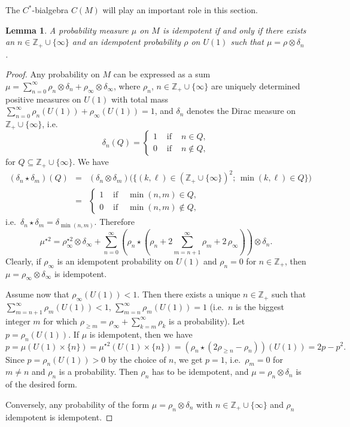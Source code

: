 \documentclass[12pt]{amsart}
\newtheorem{lemma}[theorem]{Lemma}
\theoremstyle{definition}
\theoremstyle{remark}
\numberwithin{equation}{section}
\begin{document}
The $C^*$-bialgebra $C(M)$ will play an important role in this section.

\begin{lemma}\label{id-M}
A probability measure $\mu$ on $M$ is idempotent if and only if
there exists an $n\in\mathbb{Z}_+\cup\{\infty\}$ and
an idempotent probability $\rho$ on $U(1)$ such that $\mu=\rho\otimes \delta_{n}$.
\end{lemma}
\begin{proof}
Any probability on $M$ can be expressed as a sum $\mu=\sum_{n=0}^\infty
\rho_n\otimes \delta_n + \rho_\infty\otimes \delta_{\infty}$, where $\rho_n$,
$n\in\mathbb{Z}_+\cup\{\infty\}$ are uniquely determined positive measures on $U(1)$ with total mass
$\sum_{n=0}^\infty\rho_n(U(1))+\rho_\infty(U(1))=1$, and $\delta_n$
denotes the Dirac measure on $\mathbb{Z}_+\cup\{\infty\}$, i.e.\
\[
\delta_n(Q) = \left\{
\begin{array}{cll}
1 & \mbox{ if } & n \in Q, \\
0 & \mbox{ if } & n \not\in Q,
\end{array}\right.
\]
for $Q\subseteq \mathbb{Z}_+\cup\{\infty\}$. We have
\begin{eqnarray*}
(\delta_n\star\delta_m)(Q) &=&
(\delta_n\otimes\delta_m)\Big(\big\{(k,\ell)\in(\mathbb{Z}_+\cup\{\infty\})^2;\,\min(k,\ell)\in
Q\big\}\Big) \\
&=& \left\{\begin{array}{cll}
1 & \mbox{ if } & \min(n,m) \in Q, \\
0 & \mbox{ if } & \min(n,m) \not\in Q,
\end{array}\right.
\end{eqnarray*}
i.e.\ $\delta_n\star\delta_m=\delta_{\min(n,m)}$. Therefore
\[
\mu^{\star 2}= \rho_\infty^{\star 2}\otimes\delta_{\infty} +
\sum_{n=0}^\infty\left(\rho_n\star\left( \rho_n + 2\sum_{m=n+1}^\infty
  \rho_m + 2 \,\rho_\infty\right)\right)\otimes\delta_n.
\]
Clearly, if $\rho_\infty$ is an idempotent probability on $U(1)$ and
$\rho_n=0$ for $n\in\mathbb{Z}_+$,
then $\mu=\rho_\infty\otimes\delta_\infty$ is idempotent.

Assume now that
$\rho_\infty(U(1))<1$. Then there exists a unique $n\in\mathbb{Z}_+$ such that
$\sum_{m=n+1}^\infty \rho_m(U(1))<1$, $\sum_{m=n}^\infty
\rho_m(U(1))=1$ (i.e.\ $n$ is the biggest integer $m$ for which $\rho_{\ge
  m}=\rho_\infty+ \sum_{k=m}^\infty\rho_k$ is a probability). Let
$p=\rho_n(U(1))$. If $\mu$ is idempotent, then we have
\[
p = \mu(U(1)\times\{n\}) = \mu^{\star 2} (U(1)\times\{n\}) =\left(
\rho_n\star(2\rho_{\ge n}-\rho_n)\right)(U(1))=2p-p^2.
\]
Since $p=\rho_n(U(1))>0$ by the choice of $n$, we get $p=1$, i.e.\ $\rho_m=0$
for $m\not=n$ and $\rho_n$ is a probability. Then $\rho_n$ has to be
idempotent, and $\mu=\rho_n\otimes \delta_n$ is of the desired form.

Conversely, any probability of the form $\mu=\rho_n\otimes\delta_n$ with
$n\in\mathbb{Z}_+\cup\{\infty\}$ and $\rho_n$ idempotent is idempotent.
\end{proof}
\end{document}
